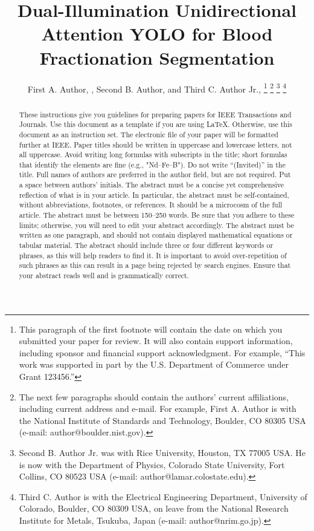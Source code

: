 \documentclass[journal,twoside,web]{ieeecolor}
\begin{document}
\title{Dual-Illumination Unidirectional Attention YOLO for Blood Fractionation Segmentation}
\author{First A. Author, , Second B. Author, and Third C. Author Jr., 
\thanks{This paragraph of the first footnote will contain the date on 
which you submitted your paper for review. It will also contain support 
information, including sponsor and financial support acknowledgment. For 
example, ``This work was supported in part by the U.S. Department of 
Commerce under Grant 123456.'' }
\thanks{The next few paragraphs should contain 
the authors' current affiliations, including current address and e-mail. For 
example, First A. Author is with the National Institute of Standards and 
Technology, Boulder, CO 80305 USA (e-mail: author@boulder.nist.gov). }
\thanks{Second B. Author Jr. was with Rice University, Houston, TX 77005 USA. He is 
now with the Department of Physics, Colorado State University, Fort Collins, 
CO 80523 USA (e-mail: author@lamar.colostate.edu).}
\thanks{Third C. Author is with 
the Electrical Engineering Department, University of Colorado, Boulder, CO 
80309 USA, on leave from the National Research Institute for Metals, 
Tsukuba, Japan (e-mail: author@nrim.go.jp).}}

\maketitle

\begin{abstract}
These instructions give you guidelines for preparing papers for 
IEEE Transactions and Journals. Use this document as a template if you are 
using \LaTeX. Otherwise, use this document as an 
instruction set. The electronic file of your paper will be formatted further 
at IEEE. Paper titles should be written in uppercase and lowercase letters, 
not all uppercase. Avoid writing long formulas with subscripts in the title; 
short formulas that identify the elements are fine (e.g., "Nd--Fe--B"). Do 
not write ``(Invited)'' in the title. Full names of authors are preferred in 
the author field, but are not required. Put a space between authors' 
initials. The abstract must be a concise yet comprehensive reflection of 
what is in your article. In particular, the abstract must be self-contained, 
without abbreviations, footnotes, or references. It should be a microcosm of 
the full article. The abstract must be between 150--250 words. Be sure that 
you adhere to these limits; otherwise, you will need to edit your abstract 
accordingly. The abstract must be written as one paragraph, and should not 
contain displayed mathematical equations or tabular material. The abstract 
should include three or four different keywords or phrases, as this will 
help readers to find it. It is important to avoid over-repetition of such 
phrases as this can result in a page being rejected by search engines. 
Ensure that your abstract reads well and is grammatically correct.
\end{abstract}
\end{document}
